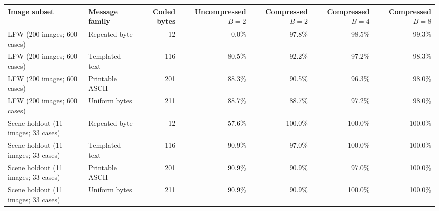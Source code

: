 \begin{tabular}{llrrrrr}
\toprule
\textbf{Image subset} & \textbf{Message family} & \textbf{Coded bytes} & \textbf{Uncompressed $B=2$} & \textbf{Compressed $B=2$} & \textbf{Compressed $B=4$} & \textbf{Compressed $B=8$} \\
\midrule
LFW (200 images; 600 cases) & Repeated byte & 12 & 0.0\% & 97.8\% & 98.5\% & 99.3\% \\
LFW (200 images; 600 cases) & Templated text & 116 & 80.5\% & 92.2\% & 97.2\% & 98.3\% \\
LFW (200 images; 600 cases) & Printable ASCII & 201 & 88.3\% & 90.5\% & 96.3\% & 98.0\% \\
LFW (200 images; 600 cases) & Uniform bytes & 211 & 88.7\% & 88.7\% & 97.2\% & 98.0\% \\
Scene holdout (11 images; 33 cases) & Repeated byte & 12 & 57.6\% & 100.0\% & 100.0\% & 100.0\% \\
Scene holdout (11 images; 33 cases) & Templated text & 116 & 90.9\% & 97.0\% & 100.0\% & 100.0\% \\
Scene holdout (11 images; 33 cases) & Printable ASCII & 201 & 90.9\% & 90.9\% & 97.0\% & 100.0\% \\
Scene holdout (11 images; 33 cases) & Uniform bytes & 211 & 90.9\% & 90.9\% & 100.0\% & 100.0\% \\
\bottomrule
\end{tabular}
